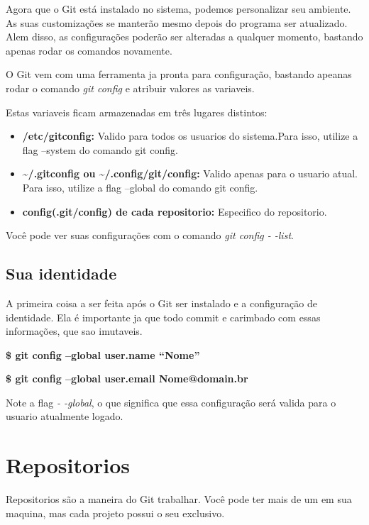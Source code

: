 \documentclass[]{article}
\begin{document}
Agora que o Git está instalado no sistema, podemos personalizar seu ambiente. 
As suas customizações se manterão mesmo depois do programa ser atualizado. 
Alem disso, as configurações poderão ser alteradas a qualquer momento, bastando apenas rodar os comandos novamente. 


O Git vem com uma ferramenta ja pronta para configuração, bastando apeanas rodar o comando \textit{git config} e atribuir valores as variaveis.


Estas variaveis ficam armazenadas em três lugares distintos:


\begin{itemize}
    \item {\textbf{/etc/gitconfig:} } Valido para todos os usuarios do sistema.Para isso, utilize a flag --system do comando git config.
    
    \item {\textbf{\textasciitilde/.gitconfig ou \textasciitilde/.config/git/config:} } Valido apenas para o usuario atual. Para isso, utilize a flag --global do comando git config.
    
    \item {\textbf{config(.git/config) de  cada repositorio:} } Especifico  do repositorio.
\end{itemize}
Você pode ver suas configurações com o comando \textit{git config - -list}.

\subsection*{Sua identidade}
A primeira coisa a ser feita  após o Git ser instalado e a configuração de identidade.
 Ela é importante ja que todo commit e carimbado com essas informações, que sao imutaveis.

\textbf{\$ git config --global user.name ``Nome'' }

\textbf{\$ git config --global user.email Nome@domain.br}

Note a flag \textit{- -global}, o que significa que essa configuração será valida para o usuario atualmente logado.

\section{Repositorios}

Repositorios são a maneira do Git  trabalhar. Você pode ter mais de um em sua maquina, mas cada projeto possui o seu exclusivo.
\end{document}
